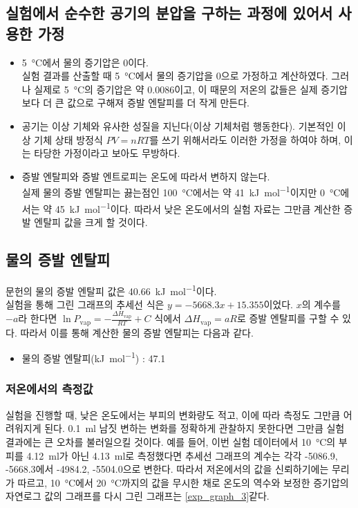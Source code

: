 \documentclass{GSHS-chemexp}
\begin{document}
	\subsection{실험에서 순수한 공기의 분압을 구하는 과정에 있어서 사용한 가정}
	\begin{itemize}
		\item \SI{5}{\degreeCelsius}에서 물의 증기압은 0이다. \\
		실험 결과를 산출할 때 \SI{5}{\degreeCelsius}에서 물의 증기압을 0으로 가정하고 계산하였다. 그러나 실제로 \SI{5}{\degreeCelsius}의 증기압은 약 \SI{0.0086}{\atmosphere}이고, 이 때문의 저온의 값들은 실제 증기압보다 더 큰 값으로 구해져 증발 엔탈피를 더 작게 만든다.
		\item 공기는 이상 기체와 유사한 성질을 지닌다(이상 기체처럼 행동한다).
		기본적인 이상 기체 상태 방정식 $PV=nRT$를 쓰기 위해서라도 이러한 가정을 하여야 하며, 이는 타당한 가정이라고 보아도 무방하다.
		\item 증발 엔탈피와 증발 엔트로피는 온도에 따라서 변하지 않는다. \\
		실제 물의 증발 엔탈피는 끓는점인 \SI{100}{\degreeCelsius}에서는 약 \SI{41}{\kilo\joule\per\mole}이지만 \SI{0}{\degreeCelsius}에서는 약 \SI{45}{\kilo\joule\per\mole}이다.\cite{vapor_1} 따라서 낮은 온도에서의 실험 자료는 그만큼 계산한 증발 엔탈피 값을 크게 할 것이다.
		
	\end{itemize}
	
	\subsection{물의 증발 엔탈피}
	문헌의 물의 증발 엔탈피 값은 \SI{40.66}{\kilo\joule\per\mole}이다. \cite{vapor_1} \\
	실험을 통해 그린 그래프의 추세선 식은 $y = -5668.3x + 15.355$이었다. $x$의 계수를 $-a$라 한다면 $\ln P_{\mathrm{vap}} = -\frac{\Delta H_{\mathrm{vap}}}{RT} + C$ 식에서 $\Delta H_{\mathrm{vap}} = aR$로 증발 엔탈피를 구할 수 있다. 따라서 이를 통해 계산한 물의 증발 엔탈피는 다음과 같다.
	\begin{itemize}
		\item 물의 증발 엔탈피(\si{\kilo\joule\per\mole}) : 47.1
	\end{itemize}
	
	\subsubsection{저온에서의 측정값}
	실험을 진행할 때, 낮은 온도에서는 부피의 변화량도 적고, 이에 따라 측정도 그만큼 어려워지게 된다. \SI{0.1}{\milli\litre} 남짓 변하는 변화를 정확하게 관찰하지 못한다면 그만큼 실험 결과에는 큰 오차를 불러일으킬 것이다. 예를 들어, 이번 실험 데이터에서 \SI{10}{\degreeCelsius}의 부피를 \SI{4.12}{\milli\litre}가 아닌 \SI{4.13}{\milli\litre}로 측정했다면 추세선 그래프의 계수는 각각 -5086.9, -5668.3에서 -4984.2, -5504.0으로 변한다. 따라서 저온에서의 값을 신뢰하기에는 무리가 따르고, \SI{10}{\degreeCelsius}에서 \SI{20}{\degreeCelsius}까지의 값을 무시한 채로 온도의 역수와 보정한 증기압의 자연로그 값의 그래프를 다시 그린 그래프는 \ref{exp_graph_3}\와 같다.
	
\end{document}
